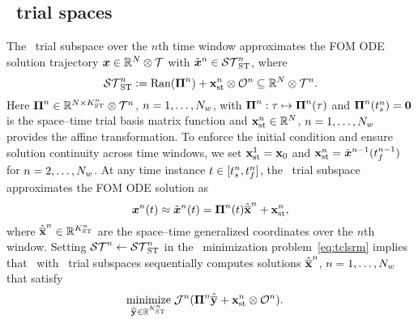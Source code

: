 \subsection{\spaceTimeAcronym\ trial spaces}\label{sec:wls_spacetime}
The \spaceTimeAcronym\ trial subspace over the $n$th time window approximates
the FOM ODE solution trajectory ${\boldsymbol x}\in\mathbb{R}^{N}\otimes\mathcal{T}$
with $\tilde{\boldsymbol x}^{n} \in \mathcal{ ST }_{\text{ST}}^{n}$, where
\begin{equation}\label{eq:st_sttrialspace}
 \mathcal{ ST }_{\text{ST}}^{n} \vcentcolon=
 \mathrm{Ran}(\boldsymbol \Pi^{n}) + \mathbf{x}_\text{st}^{n}\otimes \mathcal{O}^{n} \subseteq \mathbb{R}^{N} \otimes \mathcal{T}^{n}.
\end{equation}
Here $\boldsymbol \Pi^{n} \in \mathbb{R}^{N \times
K_{\text{ST}}^{n}}\otimes\mathcal{T}^{n}$, $n=1,\ldots,N_w$, with $\boldsymbol \Pi^{n}: \tau \mapsto \boldsymbol \Pi^{n}(\tau)$ and $\boldsymbol \Pi^{n}(t_s^{n}) = \boldsymbol 0$ is the space--time trial basis matrix {function} and $\mathbf{x}_\text{st}^{n} \in \mathbb{R}^{N}$, $n=1,\ldots,N_w$ provides the affine transformation. 
To enforce the initial condition and ensure solution continuity across time windows, we set $\mathbf{x}_\text{st}^{1} = {{\mathbf{x}}_0}$ and
$\mathbf{x}_\text{st}^{n} = \tilde{\boldsymbol x}^{n-1}(t_f^{n-1})$ for
$n=2,\ldots,N_w$.
At any time instance $t \in [t_s^{n},t_f^{n}]$, the \spaceTimeAcronym\ trial subspace approximates the FOM ODE solution as
 \begin{equation}\label{eq:stapprox}
 {\boldsymbol x}^{n}(t) \approx \tilde{\boldsymbol x}^{n}(t)  = \boldsymbol \Pi^{n}(t) \hat{\mathbf{\overline{x}}}^{n} + \mathbf{x}_\text{st}^{n},
\end{equation}
where $\hat{\mathbf{\overline{x}}}^{n} \in \mathbb{R}^{K_{\text{ST}}^{n}}$ are the space--time generalized coordinates over the $n$th window. 
Setting $\mathcal{ ST }^n \leftarrow \mathcal{ ST }_{\text{ST}}^{n}$ in the
\methodAcronym\ minimization problem~\eqref{eq:tclsrm} implies that
\methodAcronym\ with \spaceTimeAcronym\ trial subspaces sequentially computes
solutions $\hat{\mathbf{\overline{x}}}^{n}$, $n = 1,\ldots,N_w$ that satisfy
\begin{align}\label{eq:obj_gen_slab_spacetime}
\begin{split}
&\underset{\stgenstateyArg{} \in \RR{\stdimArg{n}}}{\text{minimize}}\; \mathcal{J}^n( \stbasisArgnt{n} \stgenstateyArg{} + \stateInterceptSTArg{n} \otimes \onesFunctionArg{n} ).%
\end{split}
\end{align}
